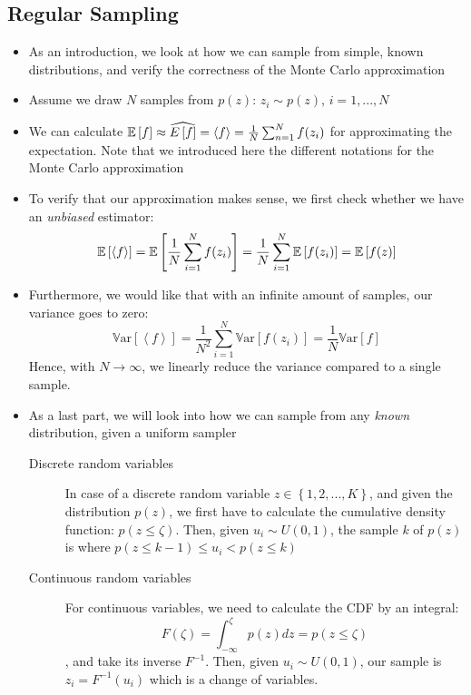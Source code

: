 \subsection{Regular Sampling}
\begin{itemize}
	\item As an introduction, we look at how we can sample from simple, known distributions, and verify the correctness of the Monte Carlo approximation
	\item Assume we draw $N$ samples from $p(z)$: $z_i\sim p(z)$, $i=1,...,N$
	\item We can calculate $\mathbb{E}\left[f\right]\approx \widehat{E\left[f\right]}=\left<f\right> = \frac{1}{N}\sum_{n=1}^{N}f(z_i)$ for approximating the expectation. Note that we introduced here the different notations for the Monte Carlo approximation
	\item To verify that our approximation makes sense, we first check whether we have an \textit{unbiased} estimator:
	$$\mathbb{E}\left[\left<f\right>\right] = \mathbb{E}\left[\frac{1}{N}\sum_{i=1}^{N}f(z_i)\right]=\frac{1}{N}\sum_{i=1}^{N}\mathbb{E}\left[f(z_i)\right]=\mathbb{E}\left[f(z)\right]$$
	\item Furthermore, we would like that with an infinite amount of samples, our variance goes to zero:
	$$\mathbb{V}\text{ar}\left[\left<f\right>\right]=\frac{1}{N^2}\sum_{i=1}^{N}\mathbb{V}\text{ar}\left[f(z_i)\right] = \frac{1}{N}\mathbb{V}\text{ar}\left[f\right]$$
	Hence, with $N\to\infty$, we linearly reduce the variance compared to a single sample.
	\item As a last part, we will look into how we can sample from any \textit{known} distribution, given a uniform sampler
	\begin{description}
		\item[Discrete random variables]  In case of a discrete random variable $z\in\left\{1,2,...,K\right\}$, and given the distribution $p(z)$, we first have to calculate the cumulative density function: $p(z\leq \zeta)$. Then, given $u_i\sim U(0,1)$, the sample $k$ of $p(z)$ is where $p(z\leq k-1)\leq  u_i < p(z\leq k)$
		\item[Continuous random variables] For continuous variables, we need to calculate the CDF by an integral:
		$$F(\zeta)=\int_{-\infty}^{\zeta} p(z)dz = p(z\leq \zeta)$$
		, and take its inverse $F^{-1}$. Then, given $u_i\sim U(0,1)$, our sample is $z_i=F^{-1}(u_i)$ which is a change of variables.
	\end{description}
\end{itemize}
